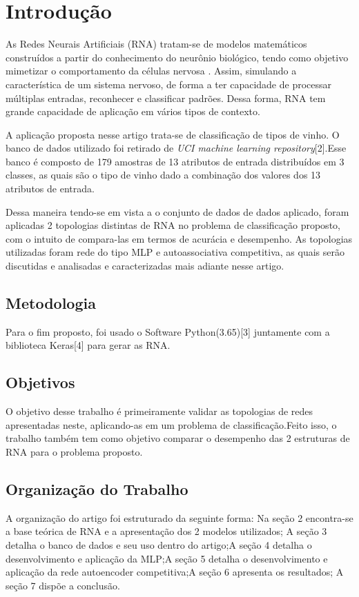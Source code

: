
\section{Introdução}
As Redes Neurais Artificiais (RNA) tratam-se de modelos matemáticos construídos a partir do conhecimento do neurônio biológico, tendo como objetivo mimetizar o comportamento da células nervosa \cite{ref1} . Assim, simulando a característica de um sistema nervoso, de forma a ter capacidade de processar múltiplas entradas, reconhecer e classificar padrões. Dessa forma, RNA tem grande capacidade de aplicação em vários tipos de contexto.

A aplicação proposta nesse artigo trata-se de classificação de tipos de vinho. O banco de dados utilizado foi retirado de \textit{UCI machine learning repository}[2].Esse banco é composto de 179 amostras de 13 atributos de entrada distribuídos em 3 classes, as quais são o tipo de vinho dado a combinação dos valores dos 13  atributos de entrada.

Dessa maneira tendo-se em vista a o conjunto de dados de dados aplicado, foram aplicadas 2 topologias distintas de RNA no problema de classificação proposto, com o intuito de compara-las em termos de acurácia e desempenho. As topologias utilizadas foram rede do tipo MLP e autoassociativa competitiva, as quais serão discutidas e analisadas e caracterizadas mais adiante nesse artigo.


\subsection{Metodologia}

Para o fim proposto, foi usado o Software Python(3.65)[3] juntamente com a biblioteca Keras[4] para gerar as RNA.


\subsection{Objetivos}

O objetivo desse trabalho é primeiramente validar as topologias de redes apresentadas neste, aplicando-as em um problema de classificação.Feito isso, o trabalho também tem como objetivo comparar o desempenho das 2 estruturas de RNA para  o problema proposto.


\subsection{Organização do Trabalho}

A organização do artigo foi estruturado da seguinte forma: Na seção 2 encontra-se a base teórica de RNA e a apresentação dos 2 modelos utilizados; A seção 3 detalha o banco de dados e seu uso dentro do artigo;A seção 4 detalha o desenvolvimento e aplicação da MLP;A seção 5 detalha o desenvolvimento e aplicação da rede autoencoder competitiva;A seção 6 apresenta os resultados; A seção 7 dispõe a conclusão. 